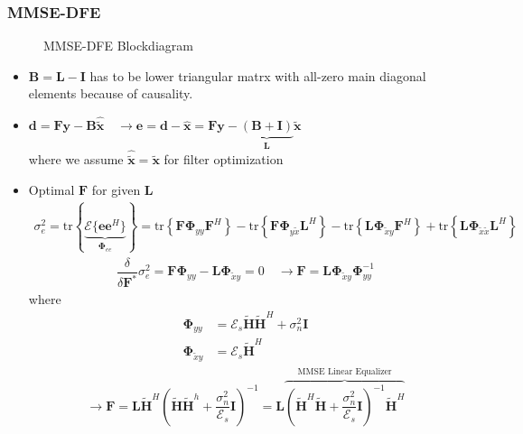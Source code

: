\documentclass[a4paper, 10pt]{article}
\begin{document}
\subsubsection*{MMSE-DFE}
\begin{figure}[h]
	\centering
	
	\caption{MMSE-DFE Blockdiagram}
	\label{MMSE_DFE_Block}
\end{figure}
\begin{itemize}
	\item $\mathbf{B}=\mathbf{L}-\mathbf{I}$ has to be lower triangular matrx with all-zero main diagonal elements because of causality.
	\item $\mathbf{d}=\mathbf{Fy}-\mathbf{B}\hat{\tilde{\mathbf{x}}} \quad \rightarrow \mathbf{e}=\mathbf{d}-\hat{\mathbf{x}}=\mathbf{Fy}-\underbrace{(\mathbf{B}+\mathbf{I})}_{\mathbf{L}}\tilde{\mathbf{x}}$\\
	where we assume $\hat{\tilde{\mathbf{x}}}=\tilde{\mathbf{x}}$ for filter optimization
	\item Optimal $\mathbf{F}$ for given $\mathbf{L}$ \\
	\begin{align*}
		\sigma_e^2=\mathrm{tr}\left\{\underbrace{\mathcal{E}\{\mathbf{ee}^H\} }_{\boldsymbol{\Phi}_{ee}}\right\}
		=\mathrm{tr}\left\{\mathbf{F}\boldsymbol{\Phi}_{yy}\mathbf{F}^H\right\}-\mathrm{tr}\left\{\mathbf{F}\boldsymbol{\Phi}_{y \tilde{x}}\mathbf{L}^H\right\}
		-\mathrm{tr}\left\{\mathbf{L}\boldsymbol{\Phi}_{\tilde{x} y}\mathbf{F}^H\right\}
		+\mathrm{tr}\left\{\mathbf{L}\boldsymbol{\Phi}_{\tilde{x} \tilde{x}}\mathbf{L}^H\right\}
	\end{align*}
	\begin{align*}
		\dfrac{\delta}{\delta \mathbf{F}^*}\sigma_e^2=\mathbf{F}\boldsymbol{\Phi}_{yy}-\mathbf{L}\boldsymbol{\Phi}_{\tilde{x}y}=0 \quad \rightarrow \mathbf{F}
		=\mathbf{L}\boldsymbol{\Phi}_{\tilde{x}y}\boldsymbol{\Phi}_{yy}^{-1}
	\end{align*}
	where
	\begin{align*}
		\boldsymbol{\Phi}_{yy}&=\mathcal{E}_s\tilde{\mathbf{H}}\tilde{\mathbf{H}}^H+\sigma_n^2\mathbf{I}\\
		\boldsymbol{\Phi}_{\tilde{x}y}&=\mathcal{E}_s\tilde{\mathbf{H}}^H
	\end{align*}
	\begin{align*}
		\rightarrow \mathbf{F}=\mathbf{L}\tilde{\mathbf{H}}^H(\tilde{\mathbf{H}}\tilde{\mathbf{H}}^h+\dfrac{\sigma_n^2}{\mathcal{E}_s}\mathbf{I})^{-1}
		=\mathbf{L}\overbrace{(\tilde{\mathbf{H}}^H\tilde{\mathbf{H}}+\dfrac{\sigma_n^2}{\mathcal{E}_s}\mathbf{I})^{-1}\tilde{\mathbf{H}}^H}^{\text{MMSE Linear Equalizer}}

\end{align*}
\end{itemize}
\end{document}
